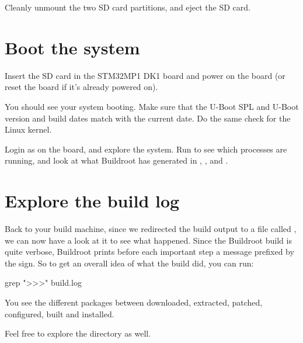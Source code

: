 Cleanly unmount the two SD card partitions, and eject the SD card.

\section{Boot the system}

Insert the SD card in the STM32MP1 DK1 board and power on the board
(or reset the board if it's already powered on).

You should see your system booting. Make sure that the U-Boot SPL and
U-Boot version and build dates match with the current date. Do the
same check for the Linux kernel.

Login as  on the board, and explore the system. Run
 to see which processes are running, and look at what
Buildroot has generated in , ,  and
.

\section{Explore the build log}

Back to your build machine, since we redirected the build output to a
file called , we can now have a look at it to see what
happened. Since the Buildroot build is quite verbose, Buildroot prints
before each important step a message prefixed by the \code{>>>}
sign. So to get an overall idea of what the build did, you can run:

\begin{bashinput}
grep ">>>" build.log
\end{bashinput}

You see the different packages between downloaded, extracted, patched,
configured, built and installed.

Feel free to explore the  directory as well.
